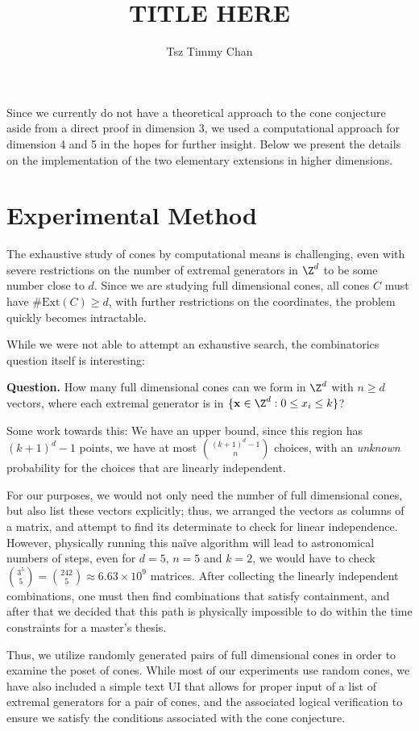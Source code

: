 \documentclass{TC}
\title{TITLE HERE}	%
\author{Tsz Timmy Chan}	%
\begin{document}
Since we currently do not have a theoretical approach to the cone conjecture aside from a direct proof in dimension 3, we used a computational approach for dimension 4 and 5 in the hopes for further insight. Below we present the details on the implementation of the two elementary extensions in higher dimensions. 


\section{Experimental Method} 
The exhaustive study of cones by computational means is challenging, even with severe restrictions on the number of extremal generators in $\Z^d$ to be some number close to $d$. Since we are studying full dimensional cones, all cones $C$ must have $\#\mathrm{Ext}(C) \geq d$, with further restrictions on the coordinates, the problem quickly becomes intractable. 

While we were not able to attempt an exhaustive search, the combinatorics question itself is interesting:

\noindent \textbf{Question.} How many full dimensional cones can we form in $\Z^d$ with $n \geq d$ vectors, where each extremal generator is in $\{\mathbf{x} \in \Z^d : 0\leq x_i \leq k\}$? 

Some work towards this: We have an upper bound, since this region has $(k+1)^d-1$ points, we have at most ${(k+1)^d-1 \choose n}$ choices, with an \emph{unknown} probability for the choices that are linearly independent. 

For our purposes, we would not only need the number of full dimensional cones, but also list these vectors explicitly; thus, we arranged the vectors as columns of a matrix, and attempt to find its determinate to check for linear independence. However, physically running this na\"ive algorithm will lead to astronomical numbers of steps, even for $d = 5$, $n = 5$ and $k = 2$, we would have to check $\displaystyle { 3^5 \choose 5} = {242 \choose 5} \approx 6.63 \times 10^{9} $ matrices. After collecting the linearly independent combinations, one must then find combinations that satisfy containment, and after that we decided that this path is physically impossible to do within the time constraints for a master's thesis. 

Thus, we utilize randomly generated pairs of full dimensional cones in order to examine the poset of cones. While most of our experiments use random cones, we have also included a simple text UI that allows for proper input of a list of extremal generators for a pair of cones, and the associated logical verification to ensure we satisfy the conditions associated with the cone conjecture.  
\end{document}
